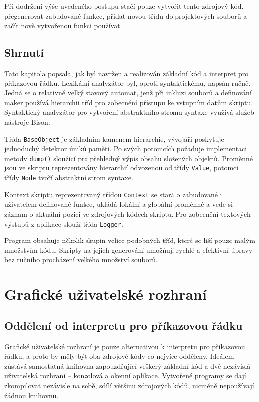 \documentclass[11pt,twoside,a4paper]{book}
\begin{document}
Při dodržení výše uvedeného postupu stačí pouze vytvořit tento zdrojový kód, přegenerovat zabudované funkce, přidat novou třídu do projektových souborů a začít nově vytvořenou funkci používat.


\subsection{Shrnutí}

Tato kapitola popsala, jak byl navržen a realizován základní kód a interpret pro příkazovou řádku. Lexikální analyzátor byl, oproti syntaktickému, napsán ručně. Jedná se o relativně velký stavový automat, jenž při inkluzi souborů a definování maker používá hierarchii tříd pro zobecnění přístupu ke vstupním datům skriptu. Syntaktický analyzátor pro vytvoření abstraktního stromu syntaxe využívá služeb nástroje Bison.

Třída \texttt{BaseObject} je základním kamenem hierarchie, vývojáři poskytuje jednoduchý detektor úniků paměti. Po svých potomcích požaduje implementaci metody \texttt{dump()} sloužící pro přehledný výpis obsahu složených objektů. Proměnné jsou ve skriptu reprezentovány hierarchií odvozenou od třídy \texttt{Value}, potomci třídy \texttt{Node} tvoří abstraktní strom syntaxe.

Kontext skriptu reprezentovaný třídou \texttt{Context} se stará o zabudované i uživatelem definované funkce, ukládá lokální a globální proměnné a vede si záznam o aktuální pozici ve zdrojových kódech skriptu. Pro zobecnění textových výstupů z aplikace slouží třída \texttt{Logger}.

Program obsahuje několik skupin velice podobných tříd, které se liší pouze malým množstvím kódu. Skripty na jejich generování umožňují rychlé a efektivní úpravy bez ručního procházení velkého množství souborů.


\section{Grafické uživatelské rozhraní}

\subsection{Oddělení od interpretu pro příkazovou řádku}
\label{oddeleni_od_interpretu_pro_prikazovou_radku}

Grafické uživatelské rozhraní je pouze alternativou k interpretu pro příkazovou řádku, a proto by měly být oba zdrojové kódy co nejvíce odděleny. Ideálem zůstává samostatná knihovna zapouzdřující veškerý základní kód a dvě nezávislá uživatelská rozhraní -- konzolová a okenní aplikace. Vytvořené programy se dají zkompilovat nezávisle na sobě, sdílí většinu zdrojových kódů, nicméně nepoužívají žádnou knihovnu.
\end{document}
